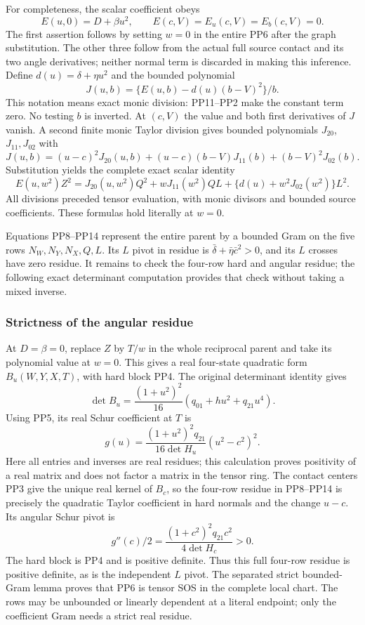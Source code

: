 For completeness, the scalar coefficient obeys
\[
 E(u,0)=D+\beta u^2,\qquad
 E(c,V)=E_u(c,V)=E_b(c,V)=0.
 \tag{PP11}
\]
The first assertion follows by setting $w=0$ in the entire PP6
after the graph substitution. The other three follow from the
actual full source contact and its two angle derivatives; neither
normal term is discarded in making this inference.
Define $d(u)=\delta+\eta u^2$ and the bounded polynomial
\[
 J(u,b)=\{E(u,b)-d(u)(b-V)^2\}/b.
 \tag{PP12}
\]
This notation means exact monic division: PP11--PP2 make the
constant term zero. No testing $b$ is inverted. At $(c,V)$
the value and both first derivatives of $J$ vanish. A second
finite monic Taylor division gives bounded polynomials $J_{20}$,
$J_{11},J_{02}$ with
\[
 J(u,b)=(u-c)^2J_{20}(u,b)
       +(u-c)(b-V)J_{11}(b)+(b-V)^2J_{02}(b).
 \tag{PP13}
\]
Substitution yields the complete exact scalar identity
\[
 E(u,w^2)Z^2=J_{20}(u,w^2)Q^2+wJ_{11}(w^2)QL
                     +\{d(u)+w^2J_{02}(w^2)\}L^2.
 \tag{PP14}
\]
All divisions preceded tensor evaluation, with monic divisors and
bounded source coefficients. These formulas hold literally at $w=0$.

Equations PP8--PP14 represent the entire parent by a bounded
Gram on the five rows $N_W,N_Y,N_X,Q,L$. Its $L$ pivot in
residue is $\bar\delta+\bar\eta\bar c^2>0$, and its $L$
crosses have zero residue. It remains to check the four-row hard
and angular residue; the following exact determinant computation
provides that check without taking a mixed inverse.

\subsubsection*{Strictness of the angular residue}

At $D=\beta=0$, replace $Z$ by $T/w$ in the whole reciprocal
parent and take its polynomial value at $w=0$. This gives a real
four-state quadratic form $B_u(W,Y,X,T)$, with hard block PP4.
The original determinant identity gives
\[
 \det B_u=\frac{(1+u^2)^2}{16}
                  (q_{01}+hu^2+q_{21}u^4).
 \tag{PP15}
\]
Using PP5, its real Schur coefficient at $T$ is
\[
 g(u)=\frac{(1+u^2)^2q_{21}}{16\det H_u}
                       (u^2-c^2)^2.
 \tag{PP16}
\]
Here all entries and inverses are real residues; this calculation
proves positivity of a real matrix and does not factor a matrix in
the tensor ring. The contact centers PP3 give the unique real
kernel of $B_c$, so the four-row residue in PP8--PP14 is precisely
the quadratic Taylor coefficient in hard normals and the change
$u-c$. Its angular Schur pivot is
\[
 g''(c)/2=\frac{(1+c^2)^2q_{21}c^2}{4\det H_c}>0.
 \tag{PP17}
\]
The hard block is PP4 and is positive definite. Thus this full
four-row residue is positive definite, as is the independent $L$
pivot. The separated strict bounded-Gram lemma proves that PP6
is tensor SOS in the complete local chart. The rows may be
unbounded or linearly dependent at a literal endpoint; only the
coefficient Gram needs a strict real residue.

